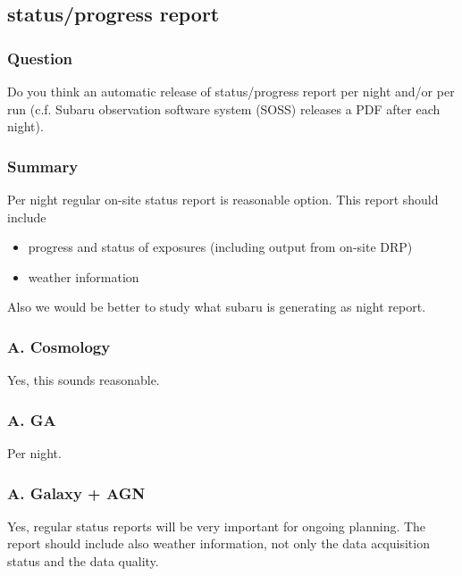 \documentclass[a4paper,notitlepage]{article}
\begin{document}
\subsection{status/progress report}

\subsubsection{Question}
Do you think an automatic release of status/progress
          report per night and/or per run (c.f. Subaru observation
          software system (SOSS) releases a PDF after each night).

\subsubsection{Summary}

Per night regular on-site status report is reasonable option. 
This report should include 
\begin{itemize}
  \item progress and status of exposures (including output from on-site DRP)
  \item weather information
\end{itemize}

Also we would be better to study what subaru is generating as night report. 

\subsubsection{A. Cosmology}
Yes, this sounds reasonable.



\subsubsection{A. GA}
Per night. 

\subsubsection{A. Galaxy + AGN}

Yes, regular status reports will be very important for 
ongoing planning. The report should include also weather 
information, not only the data acquisition status and the data 
quality.
\end{document}
